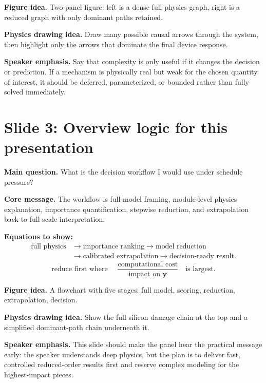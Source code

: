 \documentclass[11pt]{article}
\begin{document}
\textbf{Figure idea.} Two-panel figure: left is a dense full physics graph, right is a reduced graph with only dominant paths retained.

\textbf{Physics drawing idea.} Draw many possible causal arrows through the system, then highlight only the arrows that dominate the final device response.

\textbf{Speaker emphasis.} Say that complexity is only useful if it changes the decision or prediction. If a mechanism is physically real but weak for the chosen quantity of interest, it should be deferred, parameterized, or bounded rather than fully solved immediately.

\section{Slide 3: Overview logic for this presentation}
\begin{physicsbox}
\textbf{Main question.} What is the decision workflow I would use under schedule pressure?
\end{physicsbox}

\textbf{Core message.} The workflow is full-model framing, module-level physics explanation, importance quantification, stepwise reduction, and extrapolation back to full-scale interpretation.

\textbf{Equations to show:}
\begin{align*}
\boxed{\text{full physics}}
&\rightarrow \boxed{\text{importance ranking}}
\rightarrow \boxed{\text{model reduction}}\\
&\rightarrow \boxed{\text{calibrated extrapolation}}
\rightarrow \boxed{\text{decision-ready result}}.
\end{align*}
\begin{equation*}
\text{reduce first where }\quad
\frac{\text{computational cost}}{\text{impact on }\mathbf{y}}
\quad\text{is largest}.
\end{equation*}

\textbf{Figure idea.} A flowchart with five stages: full model, scoring, reduction, extrapolation, decision.

\textbf{Physics drawing idea.} Show the full silicon damage chain at the top and a simplified dominant-path chain underneath it.

\textbf{Speaker emphasis.} This slide should make the panel hear the practical message early: the speaker understands deep physics, but the plan is to deliver fast, controlled reduced-order results first and reserve complex modeling for the highest-impact pieces.
\end{document}
